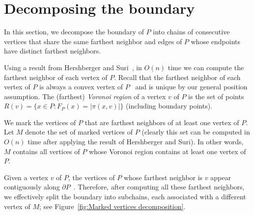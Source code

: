 \documentclass[a4paper]{article}
\newcommand{\F}[2]{\ensuremath{F_{\scriptscriptstyle #1}(#2)}}
\newcommand{\g}[2]{\ensuremath{|\pi(#1, #2)|}}
\begin{document}
\section{Decomposing the boundary}\label{Section:Decomposing the boundary}
In this section, we decompose the boundary of $P$ into chains of consecutive vertices that share the same farthest neighbor and edges of $P$ whose endpoints have distinct farthest neighbors.

Using a result from Hershberger and Suri~\cite{hershberger1993matrix}, in $O(n)$ time we can compute the farthest neighbor of each vertex of $P$.
Recall that the farthest neighbor of each vertex of $P$ is always a convex vertex of $P$~\cite{at-cgcsp-85} and is unique by our general position assumption. The (farthest) \emph{Voronoi region} of a vertex $v$ of $P$ is the set of points $R(v) = \{x\in P : \F{P}{x} = \g{x}{v}\}$ (including boundary points).

We mark the vertices of $P$ that are farthest neighbors of at least one vertex of $P$. Let $M$ denote the set of marked vertices of $P$ (clearly this set can be computed in $O(n)$ time after applying the result of Hershberger and Suri).
In other words, $M$ contains all vertices of $P$ whose Voronoi region contains at least one vertex of $P$.

Given a vertex $v$ of $P$, the vertices of $P$ whose farthest neighbor is $v$ appear contiguously along $\partial P$~\cite{aronov1993furthest}. Therefore, after computing all these farthest neighbors, we effectively split the boundary into subchains, each associated with a different vertex of $M$; see Figure~\ref{fig:Marked vertices decomposition}.
\end{document}
